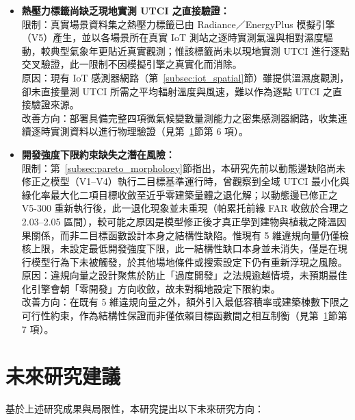 \begin{itemize}
    原因：第一項係因公眾協作圖資之屬性完整度不一；後兩項係為在 300 場景規模下維持運算可行性之取捨。\\
    改善方向：整合政府測繪之樓層屬性補全建物高度；逐點求解街谷尺度風場取代單一參考風速；蒐集代表性建物之實測構造參數取代標準假設（見第~\ref{sec:future_work}節第 1 項）。
    \item \textbf{熱壓力標籤尚缺乏現地實測 UTCI 之直接驗證：}\\
    限制：真實場景資料集之熱壓力標籤已由 Radiance／EnergyPlus 模擬引擎（V5）產生，並以各場景所在真實 IoT 測站之逐時實測氣溫與相對濕度驅動，較典型氣象年更貼近真實觀測；惟該標籤尚未以現地實測 UTCI 進行逐點交叉驗證，此一限制不因模擬引擎之真實化而消除。\\
    原因：現有 IoT 感測器網路（第~\ref{subsec:iot_spatial}節）雖提供溫濕度觀測，卻未直接量測 UTCI 所需之平均輻射溫度與風速，難以作為逐點 UTCI 之直接驗證來源。\\
    改善方向：部署具備完整四項微氣候變數量測能力之密集感測器網路，收集連續逐時實測資料以進行物理驗證（見第~\ref{sec:future_work}節第 6 項）。
    \item \textbf{開發強度下限約束缺失之潛在風險：}\\
    限制：第~\ref{subsec:pareto_morphology}節指出，本研究先前以動態邊缺陷尚未修正之模型（V1--V4）執行二目標基準運行時，曾觀察到全域 UTCI 最小化與綠化率最大化二項目標收斂至近乎零建築量體之退化解；以動態邊已修正之 V5-300 重新執行後，此一退化現象並未重現（帕累托前緣 FAR 收斂於合理之 2.03--2.05 區間），較可能之原因是模型修正後才真正學到建物與植栽之降溫因果關係，而非二目標函數設計本身之結構性缺陷。惟現有 5 維違規向量仍僅檢核上限，未設定最低開發強度下限，此一結構性缺口本身並未消失，僅是在現行模型行為下未被觸發，於其他場地條件或搜索設定下仍有重新浮現之風險。\\
    原因：違規向量之設計聚焦於防止「過度開發」之法規逾越情境，未預期最佳化引擎會朝「零開發」方向收斂，故未對稱地設定下限約束。\\
    改善方向：在既有 5 維違規向量之外，額外引入最低容積率或建築棟數下限之可行性約束，作為結構性保證而非僅依賴目標函數間之相互制衡（見第~\ref{sec:future_work}節第 7 項）。
\end{itemize}


\section{未來研究建議}
\label{sec:future_work}

基於上述研究成果與局限性，本研究提出以下未來研究方向：

